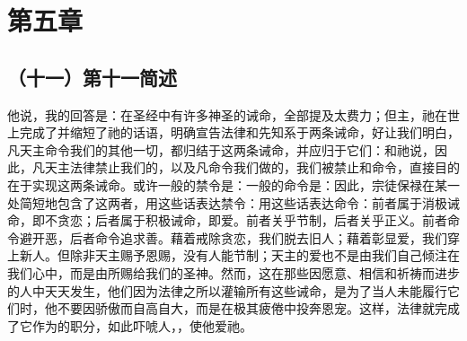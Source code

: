 
\section{第五章}


\subsection{（十一）第十一简述}

他说，我的回答是：在圣经中有许多神圣的诫命，全部提及太费力；但主，祂在世上完成了并缩短了祂的话语，明确宣告法律和先知系于两条诫命，好让我们明白，凡天主命令我们的其他一切，都归结于这两条诫命，并应归于它们：和祂说，因此，凡天主法律禁止我们的，以及凡命令我们做的，我们被禁止和命令，直接目的在于实现这两条诫命。或许一般的禁令是：一般的命令是：因此，宗徒保禄在某一处简短地包含了这两者，用这些话表达禁令：用这些话表达命令：前者属于消极诫命，即不贪恋；后者属于积极诫命，即爱。前者关乎节制，后者关乎正义。前者命令避开恶，后者命令追求善。藉着戒除贪恋，我们脱去旧人；藉着彰显爱，我们穿上新人。但除非天主赐予恩赐，没有人能节制；天主的爱也不是由我们自己倾注在我们心中，而是由所赐给我们的圣神。然而，这在那些因愿意、相信和祈祷而进步的人中天天发生，他们因为法律之所以灌输所有这些诫命，是为了当人未能履行它们时，他不要因骄傲而自高自大，而是在极其疲倦中投奔恩宠。这样，法律就完成了它作为的职分，如此吓唬人，，使他爱祂。\par



